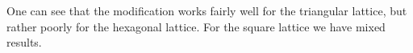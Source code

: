 \documentclass[smallextended]{svjour3}
\begin{document}
One can see that the modification works fairly well for the triangular 
lattice, but rather poorly for the hexagonal lattice. For the square lattice 
we have mixed results. 

\begin{comment} 
\subsection{Upper and lower bounds for the optimum} 

Another approach is to include some good upper and lower bounds for 
$\lambda$ in the formulation. In our case, of course, the proper 
upper bound is in question. We used the algorithm of binary search 
for determining it. The idea is to contract the lower and the upper 
bound as long as the gap between them (upper bound minus lower bound) 
is small enough. And the optimization may start only after this process 
with the received limits. We took the value received from CPLEX in 
the classical model for the initial lower bound, while we multiplied 
it by 2 in the case of $\ell_{2}(dist)$, and by 3 in the case of 
$\ell_{3}(dist)$, for the initial upper bound. In each iteration 
either the lower bound is attempted to move upward or the upper bound 
down. There is an admissibility problem solved each time. We set the 
required gap to 0.5. Our results are shown in the following table 
(only the running times are indicated, since the outcomes are the 
same in both cases as above): 

\begin{center} 
\begin{tabular}{|c|c|c|} 
\hline 
Lattice & $\ell_{2}(dist)=3-dist$ , new (s) & $\ell_{2}(dist)=3-dist$ , old (s)\\ 
\hline 
\hline 
Hexagonal & 13.28+135.43=148.71  & 4.57 \\ 
\hline 
Triangular & 447.24+883.27=1330.51 & 38.62 \\ 
\hline 
Square & 118.89+198.25=317.14 & 15.34 \\ 
\hline 
\multicolumn{1}{c}{ 
} & \multicolumn{1}{c}{ 
} & 
\\ 
\hline 
Lattice & $\ell_{3}(dist)=4-dist$ , new (s) & $\ell_{3}(dist)=4-dist$ , old (s)\\ 
\hline 
\hline 
Hexagonal & 337947+410468=748414  & 5777.68 \\ 
\hline 
Triangular & --- & 103883 \\ 
\hline 
Square & --- & 27793.8 \\ 
\hline 
\end{tabular} 
\par\end{center} 

The first addend in the sum is the running time needed for the calculation 
of the bounds, while the second one is the running time needed for 
the optimization itself. Incontrary to the expectations, the method 
did not improve the program, and even slowed it. And in addition, 
after the reduction of the feasible set, it is difficult to cut off 
some branches in the search tree (Bounding). Therefore the optimum 
search takes longer time than previously. 
\end{comment} 
\end{document}
